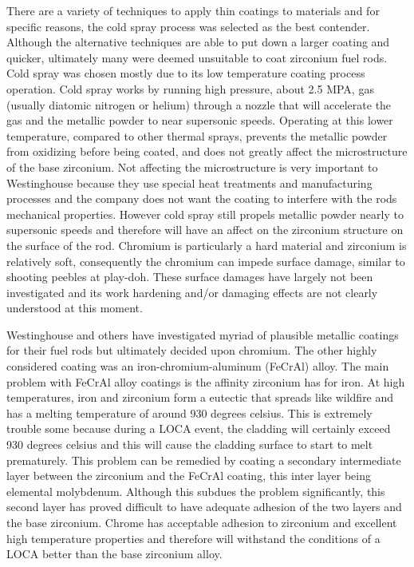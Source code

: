 \documentclass{article}
\begin{document}
There are a variety of techniques to apply thin coatings to materials and for specific reasons, the cold spray process was selected as the best contender.  Although the alternative techniques are able to put down a larger coating and quicker, ultimately many were deemed unsuitable to coat zirconium fuel rods.  Cold spray was chosen mostly due to its low temperature coating process operation.  Cold spray works by running high pressure, about 2.5 MPA, gas (usually diatomic nitrogen or helium) through a nozzle that will accelerate the gas and the metallic powder to near supersonic speeds.  Operating at this lower temperature, compared to other thermal sprays, prevents the metallic powder from oxidizing before being coated, and does not greatly affect the microstructure of the base zirconium.  Not affecting the microstructure is very important to Westinghouse because they use special heat treatments and manufacturing processes and the company does not want the coating to interfere with the rods mechanical properties.  However cold spray still propels metallic powder nearly to supersonic speeds and therefore will have an affect on the zirconium structure on the surface of the rod.  Chromium is particularly a hard material and zirconium is relatively soft, consequently the chromium can impede surface damage, similar to shooting peebles at play-doh. These surface damages have largely not been investigated and its work hardening and/or damaging effects are not clearly understood at this moment.  

Westinghouse and others have investigated myriad of plausible metallic coatings for their fuel rods but ultimately decided upon chromium.  The other highly considered coating was an iron-chromium-aluminum (FeCrAl) alloy.  The main problem with FeCrAl alloy coatings is the affinity zirconium has for iron.  At high temperatures, iron and zirconium form a eutectic that spreads like wildfire and has a melting temperature of around 930 degrees celsius.  This is extremely trouble some because during a LOCA event, the cladding will certainly exceed 930 degrees celsius and this will cause the cladding surface to start to melt prematurely.  This problem can be remedied by coating a secondary intermediate layer between the zirconium and the FeCrAl coating, this inter layer being elemental molybdenum.  Although this subdues the problem significantly, this second layer has proved difficult to have adequate adhesion of the two layers and the base zirconium.  Chrome has acceptable adhesion to zirconium and excellent high temperature properties and therefore will withstand the conditions of a LOCA better than the base zirconium alloy.
\end{document}
